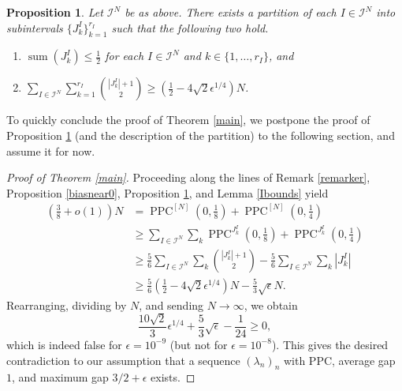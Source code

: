 \documentclass[12pt]{amsart}
\newtheorem{proposition}{Proposition}[section]
\theoremstyle{definition}
\newcommand{\vs}{\vspace{3mm}}
\newcommand{\mc}{\mathcal}
\newcommand{\ep}{\epsilon}
\newcommand{\lam}{\lambda}
\DeclareMathOperator{\PPC}{PPC}
\DeclareMathOperator{\summ}{sum}
\begin{document}
\begin{proposition}\label{partition}
Let $\mc{I}^N$ be as above. There exists a partition of each $I \in \mc{I}^N$ into subintervals $\{J_k^I\}_{k=1}^{r_I}$ such that the following two hold.

\vspace{1.5mm}

\begin{enumerate}
\item $\summ(J_k^I)\leq \frac{1}{2}$ for each $I \in \mc{I}^N$ and $k \in \{1,\dots,r_I\}$, and 

\vspace{1.5mm}

\item $\sum_{I \in \mc I^N}\sum_{k=1}^{r_I} \binom{|J^I_k|+1}{2} \geq  (\frac{1}{2} - 4\sqrt{2}\epsilon^{1/4}) N$.
\end{enumerate}
\end{proposition} 


\vspace{1.5mm}

To quickly conclude the proof of Theorem \ref{main}, we postpone the proof of Proposition \ref{partition} (and the description of the partition) to the following section, and assume it for now. 

%
%

\vs

\begin{proof}[Proof of Theorem \ref{main}]

Proceeding along the lines of Remark \ref{remarker}, Proposition \ref{biasnear0}, Proposition \ref{partition}, and Lemma \ref{Ibounds} yield 
\begin{align*} 
(\frac{3}{8}+o(1))N 
&= \PPC^{[N]}(0,\frac{1}{8})+\PPC^{[N]}(0,\frac{1}{4}) \\ 
&\ge \sum_{I \in \mc{I}^N} \sum_k \PPC^{J_k^I}(0,\frac{1}{8})+\PPC^{J_k^I}(0,\frac{1}{4})\\ 
&\ge \frac{5}{6}\sum_{I \in \mc{I}^N} \sum_k \binom{|J_k^I|+1}{2} - \frac{5}{6}\sum_{I \in \mc{I}^N} \sum_k |J_k^I|  \\ 
&\ge \frac{5}{6}(\frac{1}{2}-4\sqrt{2}\epsilon^{1/4})N-\frac{5}{3}\sqrt{\epsilon}N.
\end{align*} Rearranging, dividing by $N$, and sending $N \to \infty$, we obtain $$\frac{10\sqrt{2}}{3}\epsilon^{1/4} + \frac{5}{3}\sqrt \epsilon - \frac{1}{24} \ge 0,$$ which is indeed false for $\epsilon = 10^{-9}$ (but not for $\epsilon = 10^{-8}$). This gives the desired contradiction to our assumption that a sequence $(\lam_n)_n$ with PPC, average gap $1$, and maximum gap $3/2+\ep$ exists.
\end{proof}
\end{document}

